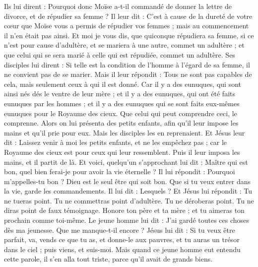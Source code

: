 \begin{multicols}{2}
Ils lui dirent : Pourquoi donc Moïse a-t-il commandé de donner la lettre de divorce, et de répudier sa femme ?
Il leur dit : C'est à cause de la dureté de votre cœur que Moïse vous a permis de répudier vos femmes ; mais au commencement il n'en était pas ainsi.
Et moi je vous dis, que quiconque répudiera sa femme, si ce n’est pour cause d’adultère, et se mariera à une autre, commet un adultère ; et que celui qui se sera marié à celle qui est répudiée, commet un adultère.
Ses disciples lui dirent : Si telle est la condition de l'homme à l'égard de sa femme, il ne convient pas de se marier.
Mais il leur répondit : Tous ne sont pas capables de cela, mais seulement ceux à qui il est donné.
Car il y a des eunuques, qui sont ainsi nés dés le ventre de leur mère ; et il y a des eunuques, qui ont été faits eunuques par les hommes ; et il y a des eunuques qui se sont faits eux-mêmes eunuques pour le Royaume des cieux. Que celui qui peut comprendre ceci, le comprenne.
Alors on lui présenta des petits enfants, afin qu'il leur impose les mains et qu'il prie pour eux. Mais les disciples les en reprenaient.
Et Jésus leur dit : Laissez venir à moi les petits enfants, et ne les empêchez pas ; car le Royaume des cieux est pour ceux qui leur ressemblent.
Puis il leur imposa les mains, et il partit de là.
Et voici, quelqu’un s’approchant lui dit : Maître qui est bon, quel bien ferai-je pour avoir la vie éternelle ?
Il lui répondit : Pourquoi m'appelles-tu bon ? Dieu est le seul être qui soit bon. Que si tu veux entrer dans la vie, garde les commandements.
Il lui dit : Lesquels ? Et Jésus lui répondit : Tu ne tueras point. Tu ne commettras point d’adultère. Tu ne déroberas point. Tu ne diras point de faux témoignage.
Honore ton père et ta mère ; et tu aimeras ton prochain comme toi-même.
Le jeune homme lui dit : J’ai gardé toutes ces choses dès ma jeunesse. Que me manque-t-il encore ?
Jésus lui dit : Si tu veux être parfait, va, vends ce que tu as, et donne-le aux pauvres, et tu auras un trésor dans le ciel ; puis viens, et suis-moi.
Mais quand ce jeune homme eut entendu cette parole, il s'en alla tout triste, parce qu'il avait de grands biens.

\end{multicols}
